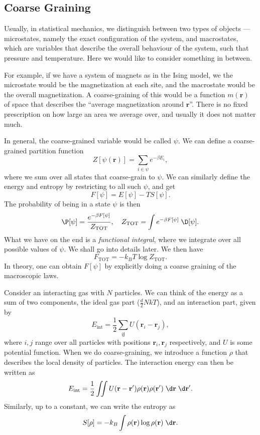 \documentclass[a4paper]{article}
\begin{document}
\subsection{Coarse Graining}
Usually, in statistical mechanics, we distinguish between two types of objects --- microstates, namely the exact configuration of the system, and macrostates, which are variables that describe the overall behaviour of the system, such that pressure and temperature. Here we would like to consider something in between.

For example, if we have a system of magnets as in the Ising model, we the microstate would be the magnetization at each site, and the macrostate would be the overall magnetization. A coarse-graining of this would be a function $m(\mathbf{r})$ of space that describes the ``average magnetization around $\mathbf{r}$''. There is no fixed prescription on how large an area we average over, and usually it does not matter much.

In general, the coarse-grained variable would be called $\psi$. We can define a coarse-grained partition function
\[
  Z[\psi(\mathbf{r})] = \sum_{i \in \psi} e^{-\beta E_i},
\]
where we sum over all states that coarse-grain to $\psi$. We can similarly define the energy and entropy by restricting to all such $\psi$, and get
\[
  F[\psi] = E[\psi] - T S[\psi].
\]
The probability of being in a state $\psi$ is then
\[
  \P[\psi] = \frac{e^{-\beta F[\psi]}}{Z_{\mathrm{TOT}}},\quad Z_{\mathrm{TOT}} = \int e^{-\beta F[\psi]} \;\D [\psi].
\]
What we have on the end is a \emph{functional integral}, where we integrate over all possible values of $\psi$. We shall go into details later. We then have
\[
  F_{\mathrm{TOT}} = -k_B T \log Z_{\mathrm{TOT}}.
\]
In theory, one can obtain $F[\psi]$ by explicitly doing a coarse graining of the macroscopic laws.

\begin{eg}
  Consider an interacting gas with $N$ particles. We can think of the energy as a sum of two components, the ideal gas part ($\frac{d}{2}NkT$), and an interaction part, given by
  \[
    E_{\mathrm{int}} = \frac{1}{2}\sum_{i \not j} U(\mathbf{r}_i - \mathbf{r}_j),
  \]
  where $i, j$ range over all particles with positions $\mathbf{r}_i, \mathbf{r}_j$ respectively, and $U$ is some potential function. When we do coarse-graining, we introduce a function $\rho$ that describes the local density of particles. The interaction energy can then be written as
  \[
    E_{\mathrm{int}} = \frac{1}{2} \iint U(\mathbf{r} - \mathbf{r}') \rho(\mathbf{r}) \rho(\mathbf{r}') \;\d \mathbf{r} \;\d \mathbf{r}'.
  \]
  Similarly, up to a constant, we can write the entropy as
  \[
    S[\rho] = -k_B \int \rho(\mathbf{r}) \log \rho(\mathbf{r}) \;\d \mathbf{r}.
  \]
\end{eg}
\end{document}
